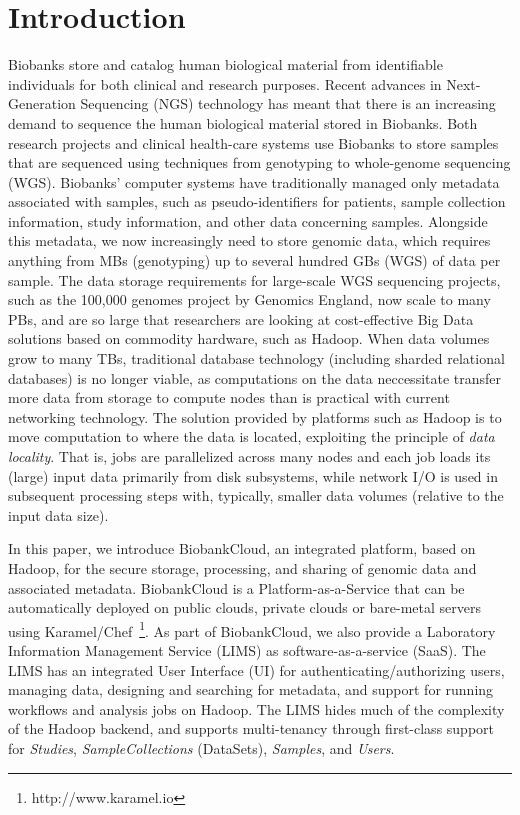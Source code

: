 \section{Introduction}
Biobanks store and catalog human biological material from identifiable individuals for both clinical and research purposes. Recent advances in Next-Generation Sequencing (NGS) technology has meant that there is an increasing demand to sequence the human biological material stored in Biobanks. Both research projects and clinical health-care systems use Biobanks to store samples that are sequenced using techniques from genotyping to whole-genome sequencing (WGS). Biobanks' computer systems have traditionally managed only metadata associated with samples, such as pseudo-identifiers for patients, sample collection information, study information, and other data concerning samples. Alongside this metadata, we now increasingly need to store genomic data, which requires anything from MBs (genotyping) up to several hundred GBs (WGS) of data per sample.
The data storage requirements for large-scale WGS sequencing projects, such as the 100,000 genomes project by Genomics England, now scale to many PBs, and are so large that researchers are looking at cost-effective Big Data solutions based on commodity hardware, such as Hadoop. When data volumes grow to many TBs, traditional database technology (including sharded relational databases) is no longer viable, as computations on the data neccessitate transfer more data from storage to compute nodes than is practical with current networking technology. The solution provided by platforms such as Hadoop is to move computation to where the data is located, exploiting the principle of \textit{data locality}. That is, jobs are parallelized across many nodes and each job loads its (large) input data primarily from disk subsystems, while network I/O is used in subsequent processing steps with, typically, smaller data volumes (relative to the input data size).

In this paper, we introduce BiobankCloud, an integrated platform, based on Hadoop, for the secure storage, processing, and sharing of genomic data and associated metadata. BiobankCloud is a Platform-as-a-Service that can be automatically deployed on public clouds, private clouds or bare-metal servers using Karamel/Chef~\footnote{http://www.karamel.io}. As part of BiobankCloud, we also provide a Laboratory Information Management Service (LIMS) as software-as-a-service (SaaS). The LIMS has an integrated User Interface (UI) for authenticating/authorizing users, managing data, designing and searching for metadata, and support for running workflows and analysis jobs on Hadoop. The LIMS hides much of the complexity of the Hadoop backend, and supports multi-tenancy through first-class support for \textit{Studies}, \textit{SampleCollections} (DataSets), \textit{Samples}, and \textit{Users}.

